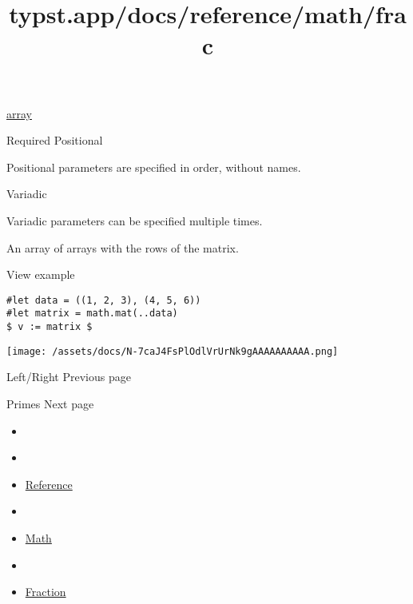 \href{/docs/reference/foundations/array/}{array}

{Required} {{ Positional }}

\label{parameters-rows-positional-tooltip}
Positional parameters are specified in order, without names.

{{ Variadic }}

\label{parameters-rows-variadic-tooltip}
Variadic parameters can be specified multiple times.

An array of arrays with the rows of the matrix.


View example

\begin{verbatim}
#let data = ((1, 2, 3), (4, 5, 6))
#let matrix = math.mat(..data)
$ v := matrix $
\end{verbatim}

\texttt{[image: /assets/docs/N-7caJ4FsPlOdlVrUrNk9gAAAAAAAAAA.png]}

\href{/docs/reference/math/lr/}{\pandocbounded{}}

{ Left/Right } { Previous page }

\href{/docs/reference/math/primes/}{\pandocbounded{}}

{ Primes } { Next page }


\title{typst.app/docs/reference/math/frac}

\begin{itemize}
\tightlist
\item
  \href{/docs}{}
\item
  
\item
  \href{/docs/reference/}{Reference}
\item
  
\item
  \href{/docs/reference/math/}{Math}
\item
  
\item
  \href{/docs/reference/math/frac/}{Fraction}
\end{itemize}

